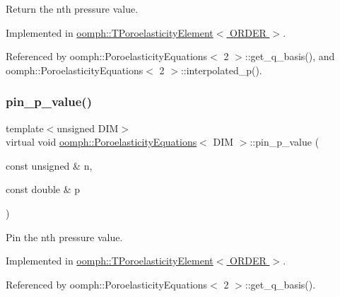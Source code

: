 Return the nth pressure value. 



Implemented in \hyperlink{classoomph_1_1TPoroelasticityElement_a82a753eb277514e69bd44025a11c18d6}{oomph\+::\+T\+Poroelasticity\+Element$<$ O\+R\+D\+E\+R $>$}.



Referenced by oomph\+::\+Poroelasticity\+Equations$<$ 2 $>$\+::get\+\_\+q\+\_\+basis(), and oomph\+::\+Poroelasticity\+Equations$<$ 2 $>$\+::interpolated\+\_\+p().

\mbox{\label{classoomph_1_1PoroelasticityEquations_a66ba2228e7e673865b11099e184496ce}} 
\subsubsection{\texorpdfstring{pin\+\_\+p\+\_\+value()}{pin\_p\_value()}}
{\footnotesize\ttfamily template$<$unsigned D\+IM$>$ \\
virtual void \hyperlink{classoomph_1_1PoroelasticityEquations}{oomph\+::\+Poroelasticity\+Equations}$<$ D\+IM $>$\+::pin\+\_\+p\+\_\+value (\begin{DoxyParamCaption}\item[{const unsigned \&}]{n,  }\item[{const double \&}]{p }\end{DoxyParamCaption})\hspace{0.3cm}{\ttfamily [pure virtual]}}



Pin the nth pressure value. 



Implemented in \hyperlink{classoomph_1_1TPoroelasticityElement_a0f5b5101a7e1a8a0dd6ac42eb53c037e}{oomph\+::\+T\+Poroelasticity\+Element$<$ O\+R\+D\+E\+R $>$}.



Referenced by oomph\+::\+Poroelasticity\+Equations$<$ 2 $>$\+::get\+\_\+q\+\_\+basis().

\mbox{\label{classoomph_1_1PoroelasticityEquations_a25b900a66e8e31ec0e5f432fcdf115d5}} 
